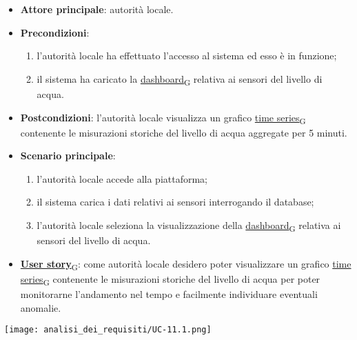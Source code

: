 \newpage

\begin{itemize}
	\item \textbf{Attore principale}: autorità locale.
	\item \textbf{Precondizioni}:
	      \begin{enumerate}
		      \item l'autorità locale ha effettuato l'accesso al sistema ed esso è in funzione;
		      \item il sistema ha caricato la \href{https://7last.github.io/docs/rtb/documentazione-interna/glossario\#dashboard}{dashboard\textsubscript{G}} relativa ai sensori del livello di acqua.
	      \end{enumerate}
	\item \textbf{Postcondizioni}: l'autorità locale visualizza un grafico \href{https://7last.github.io/docs/rtb/documentazione-interna/glossario\#time-series}{time series\textsubscript{G}} contenente le misurazioni storiche
	      del livello di acqua aggregate per 5 minuti.
	\item \textbf{Scenario principale}:
	      \begin{enumerate}
		      \item l'autorità locale accede alla piattaforma;
		      \item il sistema carica i dati relativi ai sensori interrogando il database;
		      \item l'autorità locale seleziona la visualizzazione della \href{https://7last.github.io/docs/rtb/documentazione-interna/glossario\#dashboard}{dashboard\textsubscript{G}} relativa ai sensori del livello di acqua.
	      \end{enumerate}
	\item \href{https://7last.github.io/docs/rtb/documentazione-interna/glossario\#user-story}{\textbf{User story}\textsubscript{G}}:
	      come autorità locale desidero poter visualizzare un grafico \href{https://7last.github.io/docs/rtb/documentazione-interna/glossario\#time-series}{time series\textsubscript{G}} contenente le misurazioni storiche
	      del livello di acqua per poter monitorarne l'andamento nel tempo e facilmente individuare eventuali anomalie.
\end{itemize}
\begin{center}
	\texttt{[image: analisi\_dei\_requisiti/UC-11.1.png]}
\end{center}

